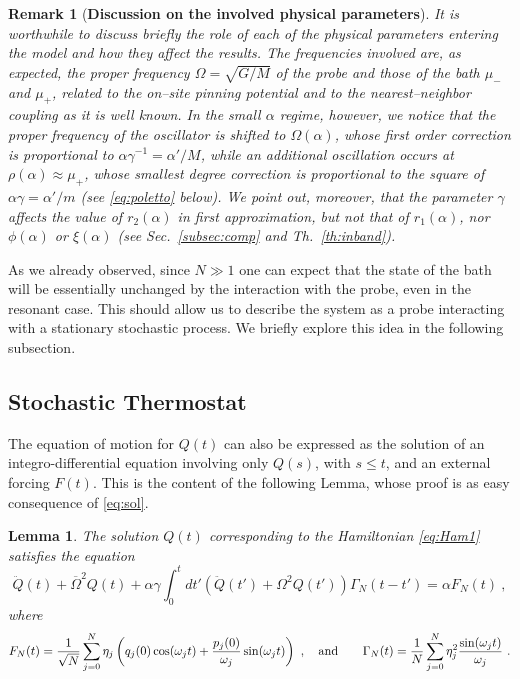 \documentclass[11pt]{article}
\numberwithin{equation}{section}
\def\red{\textcolor{red}}
\def\red{}
\newtheorem{lemma}[theorem]{Lemma}
\newtheorem{rmk}[theorem]{Remark}
\numberwithin{theorem}{section}
\begin{document}
\begin{rmk}[\textbf{Discussion on the involved physical parameters}]
\emph{ It is worthwhile to discuss briefly the role of each of the physical parameters entering the model and how they
affect the results. The frequencies involved are, as expected, the proper frequency $\Omega=\sqrt{G/M}$ of the probe and
those of the bath $\mu_-$ and $\mu_+$, related to the on--site pinning potential and to the nearest--neighbor coupling
as it is well known. In the small $\alpha$ regime, however, we notice that the proper frequency of the oscillator is
shifted to $\Omega(\alpha)$, whose first order correction is proportional to $\alpha\gamma^{-1}=\alpha'/M$, while an
additional oscillation occurs at $\rho(\alpha)\approx\mu_+$, whose smallest degree correction is proportional to the
square of $\alpha\gamma=\alpha'/m$ (see \eqref{eq:poletto} below). We point out, moreover, that the parameter $\gamma$
affects the value of $r_2(\alpha)$ in first approximation, but not that of $r_1(\alpha)$, nor $\phi(\alpha)$ or
$\xi(\alpha)$ (see Sec.~\ref{subsec:comp} and Th.~\ref{th:inband}). }
\end{rmk}

As we already observed, since $N\gg1$ one can expect that the state of the bath will be essentially unchanged by the
interaction with the probe, even in the resonant case. This should allow us to describe the system as a probe
interacting with a stationary stochastic process. We briefly explore this idea in the following subsection.


\subsection{Stochastic Thermostat} \red{The equation of motion for $Q(t)$ can also be expressed as the solution of an
integro-differential equation involving only $Q(s)$, with $s\leq t$, and an external forcing $F(t)$. This is the content
of the following Lemma, whose proof is as easy consequence of \eqref{eq:sol}.}

\red{\begin{lemma}
The solution $Q(t)$ corresponding to the Hamiltonian \eqref{eq:Ham1} satisfies the equation
\begin{equation}\label{eq:int-diff}
    \ddot Q(t)+\overline\Omega^2Q(t)+\alpha\gamma\int_0^t dt' \left(\ddot Q(t')+\Omega^2 Q(t')\right) \Gamma_N(t-t') =\alpha F_N(t)\ ,
\end{equation}
where
\begin{equation}\label{eq:forzante-diss}
F_N(t) = \frac{1}{\sqrt N}\sum_{j=0}^N \eta_j\left(q_j(0)\cos(\omega_j t)+\frac{p_j(0)}{\omega_j}\sin(\omega_j 
t)\right)\ , \quad\hbox{and}\qquad \Gamma_N(t)=\frac1N \sum_{j=0}^N\eta_j^2\frac{\sin(\omega_j t)}{\omega_j}\ .
\end{equation}
\end{lemma}
}
\end{document}
